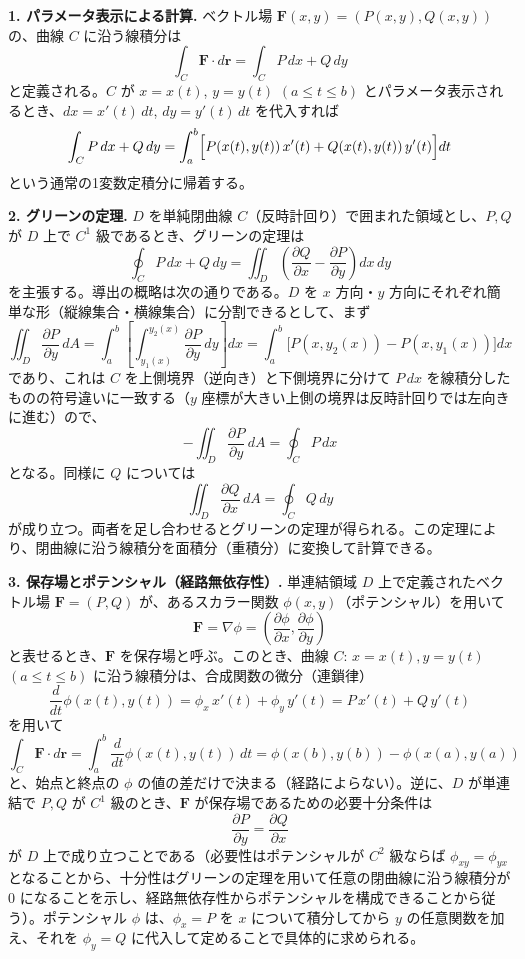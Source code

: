 \documentclass[a4paper,11pt]{article}
\begin{document}


\noindent
\textbf{1. パラメータ表示による計算.}
ベクトル場 $\bm{F}(x,y) = (P(x,y), Q(x,y))$ の、曲線 $C$ に沿う線積分は
\[
\int_{C} \bm{F}\cdot d\bm{r} = \int_{C} P\,dx + Q\,dy
\]
と定義される。$C$ が $x = x(t)$, $y = y(t)$ $(a \le t \le b)$ とパラメータ表示されるとき、$dx = x'(t)\,dt$, $dy = y'(t)\,dt$ を代入すれば
\[
\int_{C} P\,dx + Q\,dy = \int_{a}^{b} \Bigl[ P(x(t), y(t))\,x'(t) + Q(x(t), y(t))\,y'(t) \Bigr] dt
\]
という通常の1変数定積分に帰着する。

\medskip
\noindent
\textbf{2. グリーンの定理.}
$D$ を単純閉曲線 $C$（反時計回り）で囲まれた領域とし、$P, Q$ が $D$ 上で $C^{1}$ 級であるとき、グリーンの定理は
\[
\oint_{C} P\,dx + Q\,dy = \iint_{D} \left( \frac{\partial Q}{\partial x} - \frac{\partial P}{\partial y} \right) dx\,dy
\]
を主張する。導出の概略は次の通りである。$D$ を $x$ 方向・$y$ 方向にそれぞれ簡単な形（縦線集合・横線集合）に分割できるとして、まず
\[
\iint_{D} \frac{\partial P}{\partial y}\,dA = \int_{a}^{b} \left[ \int_{y_1(x)}^{y_2(x)} \frac{\partial P}{\partial y}\,dy \right] dx
= \int_{a}^{b} \bigl[ P(x, y_2(x)) - P(x, y_1(x)) \bigr] dx
\]
であり、これは $C$ を上側境界（逆向き）と下側境界に分けて $P\,dx$ を線積分したものの符号違いに一致する（$y$ 座標が大きい上側の境界は反時計回りでは左向きに進む）ので、
\[
-\iint_{D} \frac{\partial P}{\partial y}\,dA = \oint_{C} P\,dx
\]
となる。同様に $Q$ については
\[
\iint_{D} \frac{\partial Q}{\partial x}\,dA = \oint_{C} Q\,dy
\]
が成り立つ。両者を足し合わせるとグリーンの定理が得られる。この定理により、閉曲線に沿う線積分を面積分（重積分）に変換して計算できる。

\medskip
\noindent
\textbf{3. 保存場とポテンシャル（経路無依存性）.}
単連結領域 $D$ 上で定義されたベクトル場 $\bm{F} = (P, Q)$ が、あるスカラー関数 $\phi(x,y)$（ポテンシャル）を用いて
\[
\bm{F} = \nabla \phi = \left( \frac{\partial \phi}{\partial x}, \frac{\partial \phi}{\partial y} \right)
\]
と表せるとき、$\bm{F}$ を保存場と呼ぶ。このとき、曲線 $C$: $x=x(t), y=y(t)$ $(a\le t\le b)$ に沿う線積分は、合成関数の微分（連鎖律）
\[
\frac{d}{dt}\phi(x(t),y(t)) = \phi_x\,x'(t) + \phi_y\,y'(t) = P\,x'(t) + Q\,y'(t)
\]
を用いて
\[
\int_{C} \bm{F}\cdot d\bm{r} = \int_{a}^{b} \frac{d}{dt}\phi(x(t),y(t))\,dt = \phi(x(b),y(b)) - \phi(x(a),y(a))
\]
と、始点と終点の $\phi$ の値の差だけで決まる（経路によらない）。逆に、$D$ が単連結で $P, Q$ が $C^{1}$ 級のとき、$\bm{F}$ が保存場であるための必要十分条件は
\[
\frac{\partial P}{\partial y} = \frac{\partial Q}{\partial x}
\]
が $D$ 上で成り立つことである（必要性はポテンシャルが $C^{2}$ 級ならば $\phi_{xy} = \phi_{yx}$ となることから、十分性はグリーンの定理を用いて任意の閉曲線に沿う線積分が $0$ になることを示し、経路無依存性からポテンシャルを構成できることから従う）。ポテンシャル $\phi$ は、$\phi_x = P$ を $x$ について積分してから $y$ の任意関数を加え、それを $\phi_y = Q$ に代入して定めることで具体的に求められる。
\end{document}
